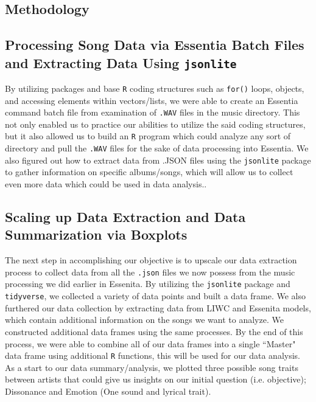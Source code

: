 \documentclass{article}\usepackage[]{graphicx}\usepackage[]{xcolor}
\begin{document}
\begin{multicols}{2}
\section{Methodology}

\subsection{Processing Song Data via Essentia Batch Files and Extracting Data Using \texttt{jsonlite}}
By utilizing packages and base \texttt{R} coding structures such as \texttt{for()} loops, objects, and accessing
elements within vectors/lists, we were able to create an Essentia command batch file from examination of 
\texttt{.WAV} files in the music directory. This not only enabled us to practice our abilities to utilize the said
coding structures, but it also allowed us to build an \texttt{R} program which could analyze any sort of directory
and pull the \texttt{.WAV} files for the sake of data processing into Essentia. We also figured out how to extract
data from .JSON files using the \texttt{jsonlite} package to gather information on specific albums/songs, which will
allow us to collect even more data which could be used in data analysis..

\subsection{Scaling up Data Extraction and Data Summarization via Boxplots}
The next step in accomplishing our objective is to upscale our data extraction process to collect data
from all the \texttt{.json} files we now possess from the music processing we did earlier in Essenita. By utilizing
the \texttt{jsonlite} package and \texttt{tidyverse}, we collected a variety of data points and built a data frame. We also furthered our data collection by extracting data from LIWC and Essenita models, which contain additional information on the songs we want to analyze. We constructed additional data frames using the same processes. By the end of this process, we were able to combine all of our data frames into a single ``Master" data frame using additional \texttt{R} functions, this will be used for our data analysis. \\
\noindent As a start to our data summary/analysis, we plotted three possible song traits between artists that could give us insights on our initial question (i.e. objective); Dissonance and Emotion (One sound and lyrical trait).


\end{multicols}
\end{document}
